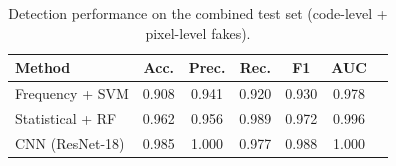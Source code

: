 
\begin{table}[h]
\centering
\caption{Detection performance on the combined test set (code-level + pixel-level fakes).}
\label{tab:results}
\begin{tabular}{lcccccc}
\toprule
\textbf{Method} & \textbf{Acc.} & \textbf{Prec.} & \textbf{Rec.} & \textbf{F1} & \textbf{AUC} \\
\midrule
Frequency + SVM & 0.908 & 0.941 & 0.920 & 0.930 & 0.978 \\
Statistical + RF & 0.962 & 0.956 & 0.989 & 0.972 & 0.996 \\
CNN (ResNet-18) & 0.985 & 1.000 & 0.977 & 0.988 & 1.000 \\
\bottomrule
\end{tabular}
\end{table}